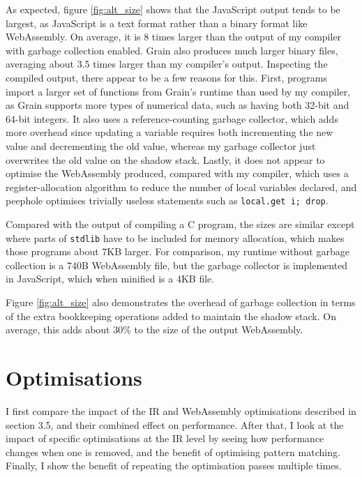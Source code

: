 As expected, figure \ref{fig:alt_size} shows that the JavaScript output tends to be largest, as JavaScript is a text format rather than a binary format like WebAssembly. On average, it is 8 times larger than the output of my compiler with garbage collection enabled. Grain also produces much larger binary files, averaging about 3.5 times larger than my compiler's output. Inspecting the compiled output, there appear to be a few reasons for this. First, programs import a larger set of functions from Grain's runtime than used by my compiler, as Grain supports more types of numerical data, such as having both 32-bit and 64-bit integers. It also uses a reference-counting garbage collector, which adds more overhead since updating a variable requires both incrementing the new value and decrementing the old value, whereas my garbage collector just overwrites the old value on the shadow stack. Lastly, it does not appear to optimise the WebAssembly produced, compared with my compiler, which uses a register-allocation algorithm to reduce the number of local variables declared, and peephole optimises trivially useless statements such as \verb|local.get i; drop|.

Compared with the output of compiling a C program, the sizes are similar except where parts of \verb|stdlib| have to be included for memory allocation, which makes those programs about 7KB larger. For comparison, my runtime without garbage collection is a 740B WebAssembly file, but the garbage collector is implemented in JavaScript, which when minified is a 4KB file.

Figure \ref{fig:alt_size} also demonstrates the overhead of garbage collection in terms of the extra bookkeeping operations added to maintain the shadow stack. %
On average, this adds about 30\% to the size of the output WebAssembly. %

\section{Optimisations}

I first compare the impact of the IR and WebAssembly optimisations described in section 3.5, and their combined effect on performance. After that, I look at the impact of specific optimisations at the IR level by seeing how performance changes when one is removed, and the benefit of optimising pattern matching. Finally, I show the benefit of repeating the optimisation passes multiple times. %


